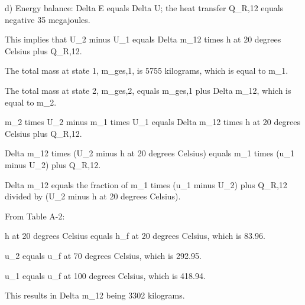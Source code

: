 d) Energy balance: Delta E equals Delta U; the heat transfer Q_R,12 equals negative 35 megajoules.

This implies that U_2 minus U_1 equals Delta m_12 times h at 20 degrees Celsius plus Q_R,12.

The total mass at state 1, m_ges,1, is 5755 kilograms, which is equal to m_1.

The total mass at state 2, m_ges,2, equals m_ges,1 plus Delta m_12, which is equal to m_2.

m_2 times U_2 minus m_1 times U_1 equals Delta m_12 times h at 20 degrees Celsius plus Q_R,12.

Delta m_12 times (U_2 minus h at 20 degrees Celsius) equals m_1 times (u_1 minus U_2) plus Q_R,12.

Delta m_12 equals the fraction of m_1 times (u_1 minus U_2) plus Q_R,12 divided by (U_2 minus h at 20 degrees Celsius).

From Table A-2:

h at 20 degrees Celsius equals h_f at 20 degrees Celsius, which is 83.96.

u_2 equals u_f at 70 degrees Celsius, which is 292.95.

u_1 equals u_f at 100 degrees Celsius, which is 418.94.

This results in Delta m_12 being 3302 kilograms.